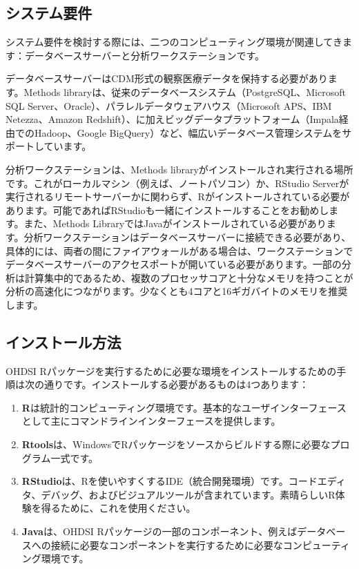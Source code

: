 \documentclass[
  11pt]{book}
\providecommand{\tightlist}{%
  \setlength{\itemsep}{0pt}\setlength{\parskip}{0pt}}
\theoremstyle{definition}
\theoremstyle{definition}
\theoremstyle{definition}
\theoremstyle{definition}
\theoremstyle{remark}
\begin{document}
\subsection{システム要件}\label{ux30b7ux30b9ux30c6ux30e0ux8981ux4ef6}

システム要件を検討する際には、二つのコンピューティング環境が関連してきます：データベースサーバーと分析ワークステーションです。 

データベースサーバーはCDM形式の観察医療データを保持する必要があります。Methods libraryは、従来のデータベースシステム（PostgreSQL、Microsoft SQL Server、Oracle）、パラレルデータウェアハウス（Microsoft APS、IBM Netezza、Amazon Redshift）、に加えビッグデータプラットフォーム（Impala経由でのHadoop、Google BigQuery）など、幅広いデータベース管理システムをサポートしています。

分析ワークステーションは、Methods libraryがインストールされ実行される場所です。これがローカルマシン（例えば、ノートパソコン）か、RStudio Serverが実行されるリモートサーバーかに関わらず、Rがインストールされている必要があります。可能であればRStudioも一緒にインストールすることをお勧めします。また、Methods LibraryではJavaがインストールされている必要があります。分析ワークステーションはデータベースサーバーに接続できる必要があり、具体的には、両者の間にファイアウォールがある場合は、ワークステーションでデータベースサーバーのアクセスポートが開いている必要があります。一部の分析は計算集中的であるため、複数のプロセッサコアと十分なメモリを持つことが分析の高速化につながります。少なくとも4コアと16ギガバイトのメモリを推奨します。

\subsection{インストール方法}\label{installR}

OHDSI Rパッケージを実行するために必要な環境をインストールするための手順は次の通りです。インストールする必要があるものは4つあります： 

\begin{enumerate}
\def\labelenumi{\arabic{enumi}.}
\tightlist
\item
  \textbf{R}は統計的コンピューティング環境です。基本的なユーザインターフェースとして主にコマンドラインインターフェースを提供します。
\item
  \textbf{Rtools}は、WindowsでRパッケージをソースからビルドする際に必要なプログラム一式です。
\item
  \textbf{RStudio}は、Rを使いやすくするIDE（統合開発環境）です。コードエディタ、デバッグ、およびビジュアルツールが含まれています。素晴らしいR体験を得るために、これを使用ください。
\item
  \textbf{Java}は、OHDSI Rパッケージの一部のコンポーネント、例えばデータベースへの接続に必要なコンポーネントを実行するために必要なコンピューティング環境です。
\end{enumerate}
\end{document}
